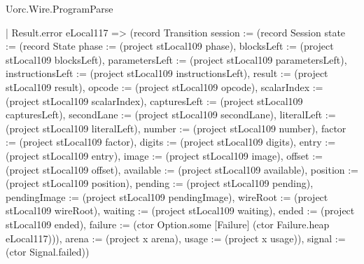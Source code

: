 \begin{lexlean}{Uorc.Wire.ProgramParse}
\begin{semanticmodule}
{      | Result.error eLocal117 => (record Transition {session := (record Session {state := (record State {phase := (project stLocal109 phase), blocksLeft := (project stLocal109 blocksLeft), parametersLeft := (project stLocal109 parametersLeft), instructionsLeft := (project stLocal109 instructionsLeft), result := (project stLocal109 result), opcode := (project stLocal109 opcode), scalarIndex := (project stLocal109 scalarIndex), capturesLeft := (project stLocal109 capturesLeft), secondLane := (project stLocal109 secondLane), literalLeft := (project stLocal109 literalLeft), number := (project stLocal109 number), factor := (project stLocal109 factor), digits := (project stLocal109 digits), entry := (project stLocal109 entry), image := (project stLocal109 image), offset := (project stLocal109 offset), available := (project stLocal109 available), position := (project stLocal109 position), pending := (project stLocal109 pending), pendingImage := (project stLocal109 pendingImage), wireRoot := (project stLocal109 wireRoot), waiting := (project stLocal109 waiting), ended := (project stLocal109 ended), failure := (ctor Option.some [Failure] (ctor Failure.heap eLocal117))}), arena := (project x arena), usage := (project x usage)}), signal := (ctor Signal.failed)})
}
\end{semanticmodule}
\end{lexlean}
